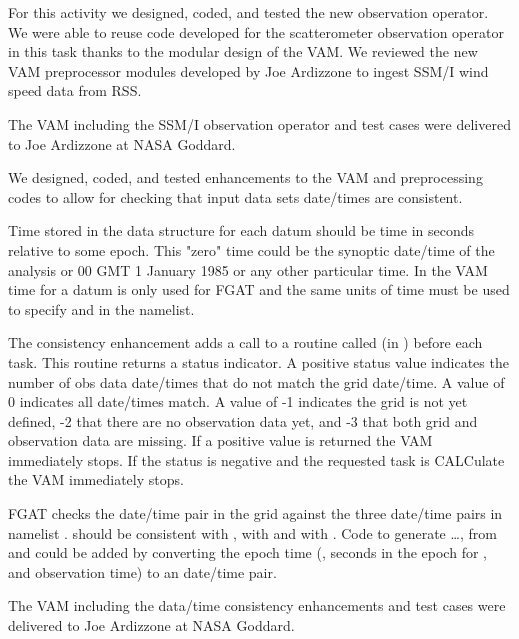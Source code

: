 \documentclass[12pt,titlepage]{article}
\begin{document}
For this activity we designed, coded, and tested the new observation
operator.
We were able to reuse code developed for the scatterometer observation
operator in this task thanks to the modular design of the VAM.
We reviewed the new VAM preprocessor modules developed by Joe
Ardizzone to ingest SSM/I wind speed data from RSS.

The VAM including the SSM/I observation operator and test
cases were delivered to Joe Ardizzone at NASA Goddard.


We designed, coded, and tested enhancements to the VAM and
preprocessing codes to allow for checking that input data sets
date/times are consistent.

Time stored in the data structure for each datum should be time in
seconds relative to some epoch.
This "zero" time could be the synoptic date/time of the analysis or 00 GMT 1
January 1985 or any other particular time.
In the VAM time for a datum is only used for FGAT and the same units
of time must be used to specify  and  in the
 namelist.

The consistency enhancement adds a call to a routine called
 (in ) before each task.
This routine returns a status indicator.
A positive  status value indicates the number of obs data 
date/times that do not match the grid date/time.
A value of 0 indicates all date/times match.
A value of -1 indicates the grid is not yet defined, -2 that there are
no observation data yet, and -3 that both grid and observation data
are missing.
If a positive value is returned the VAM immediately stops.
If the status is negative and the requested task is CALCulate the VAM
immediately stops.

FGAT checks the date/time pair in the grid against the three date/time 
pairs in namelist .
 should be consistent with ,
 with  and 
with .
Code to generate  \ldots, from
 and  could be added by converting the epoch
time (\ie, seconds in the epoch for , and observation
time) to an date/time pair.

The VAM including the data/time consistency enhancements and test
cases were delivered to Joe Ardizzone at NASA Goddard.
\end{document}
